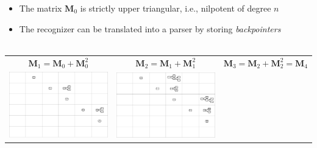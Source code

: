\documentclass[portrait,a0b,final,a4resizeable]{a0poster}
\begin{document}
\begin{poster}
\begin{multicols}{2}
      \null\hspace*{3cm}\begin{minipage}[c]{0.90\columnwidth}
      \begin{itemize}
        \item The matrix $\mathbf M_0$ is strictly upper triangular, i.e., nilpotent of degree $n$
        \item The recognizer can be translated into a parser by storing \textit{backpointers}\\\\
      \end{itemize}\vspace{-3cm}
      \begin{tabular}{ c c c }
        \small{$\mathbf{M}_1 = \mathbf{M}_0 + \mathbf{M}_0^2$} & \small{$\mathbf{M}_2 = \mathbf{M}_1 + \mathbf{M}_1^2$} & \small{$\mathbf{M}_3 = \mathbf{M}_2 + \mathbf{M}_2^2 = \mathbf{M}_4$} \\
        \includegraphics[trim=420 288 0 0,clip, width=12.24cm]{../figures/parse2.png} &
        \includegraphics[trim=420 285 0 0,clip, width=12.24cm]{../figures/parse3.png} &

\end{tabular}
\end{minipage}
\end{multicols}
\end{poster}
\end{document}

